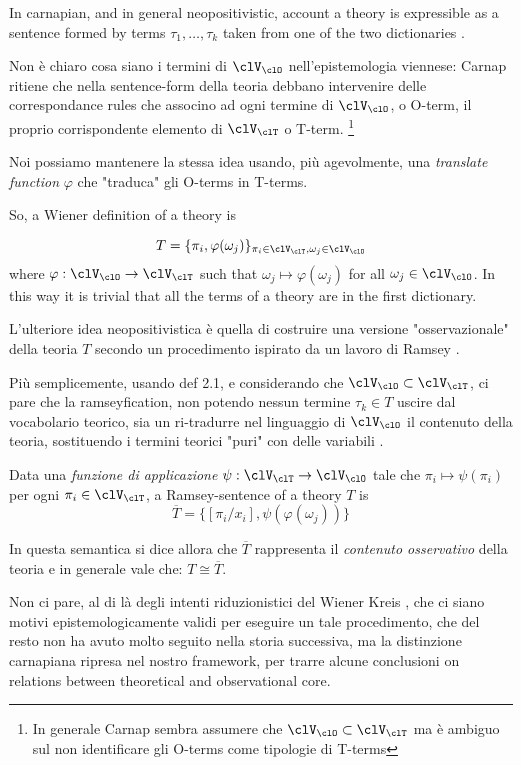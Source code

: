 In carnapian, and in general neopositivistic, account a theory is expressible as a sentence formed by terms $\tau_1, \dots, \tau_k$ taken from one of the two dictionaries \cite{?}. 

Non è chiaro cosa siano i termini di $\clV_\clO$ nell'epistemologia viennese: Carnap ritiene che nella sentence-form della teoria debbano intervenire delle correspondance rules che associno ad ogni termine di $\clV_\clO$, o O-term, il proprio corrispondente elemento di $\clV_\clT$ o T-term. \footnote{In generale Carnap sembra assumere che $\clV_\clO \subset \clV_\clT$ ma è ambiguo sul non identificare gli O-terms come tipologie di T-terms}

Noi possiamo mantenere la stessa idea usando, più agevolmente, una \emph{translate function} $\varphi$ che "traduca" gli O-terms in T-terms. 

So, a Wiener definition of a theory is 

\[  T = \{ \pi_i, \varphi (\omega_j)\}_{\pi_i \in \clV_\clT, \omega_j \in \clV_\clO}
\] 
where $\varphi: \clV_\clO \to \clV_\clT$ such that $\omega_j \mapsto \varphi (\omega_j)$ for all $\omega_j \in \clV_\clO$. In this way it is trivial that all the terms of a theory are in the first dictionary.

L'ulteriore idea neopositivistica è quella di costruire una versione "osservazionale" della teoria $T$ secondo un procedimento ispirato da un lavoro di Ramsey \cite{?}.


Più semplicemente, usando def 2.1, e considerando che $\clV_\clO \subset \clV_\clT$, ci pare che la ramseyfication, non potendo nessun termine $\tau_k \in T$ uscire dal vocabolario teorico, sia un ri-tradurre nel linguaggio di $\clV_\clO$ il contenuto della teoria, sostituendo i termini teorici "puri" con delle variabili \cite{?}.
\begin{definition}
	Data una \emph{funzione di applicazione} $\psi: \clV_\clT \to \clV_\clO$ tale che $\pi_i \mapsto \psi (\pi_i) $ per ogni $\pi_i \in \clV_\clT$, a Ramsey-sentence of a theory $T$ is 
	\[ \overline{T} = \{[\pi_i/x_i], \psi (\varphi (\omega_j))\} 
	\]
\end{definition}



In questa semantica si dice allora che $\overline{T}$ rappresenta il \emph{contenuto osservativo} della teoria e in generale vale che: $T \cong \overline{T}$. 



Non ci pare, al di là degli intenti riduzionistici del Wiener Kreis \cite{Weinb}, che ci siano motivi epistemologicamente validi per eseguire un tale procedimento, che del resto non ha avuto molto seguito nella storia successiva, ma la distinzione carnapiana ripresa nel nostro framework, per trarre alcune conclusioni on relations between theoretical and observational core.

